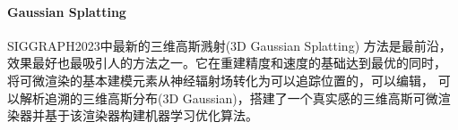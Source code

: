 \paragraph{Gaussian Splatting}

SIGGRAPH2023中最新的三维高斯溅射(3D Gaussian Splatting) \cite{kerbl3DGaussianSplatting2023} 方法是最前沿，
效果最好也最吸引人的方法之一。它在重建精度和速度的基础达到最优的同时，
将可微渲染的基本建模元素从神经辐射场转化为可以追踪位置的，可以编辑，
可以解析追溯的三维高斯分布(3D Gaussian)，搭建了一个真实感的三维高斯可微渲染器并基于该渲染器构建机器学习优化算法。

